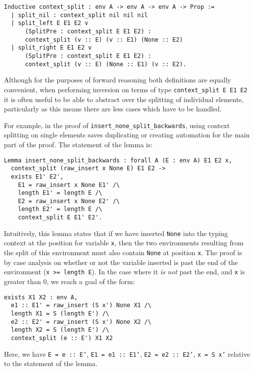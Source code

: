 \documentclass[]{unswthesis}
\let\c\texttt
\let\i\textit
\begin{document}
\begin{verbatim}
Inductive context_split : env A -> env A -> env A -> Prop :=
  | split_nil : context_split nil nil nil
  | split_left E E1 E2 v
  	  (SplitPre : context_split E E1 E2) :
  	  context_split (v :: E) (v :: E1) (None :: E2)
  | split_right E E1 E2 v
  	  (SplitPre : context_split E E1 E2) :
  	  context_split (v :: E) (None :: E1) (v :: E2).
\end{verbatim}

Although for the purposes of forward reasoning both definitions are equally convenient, when performing inversion on terms of type \c{context_split E E1 E2} it is often useful to be able to abstract over the splitting of individual elements, particularly as this means there are less cases which have to be handled.

For example, in the proof of \c{insert_none_split_backwards}, using context splitting on single elements saves duplicating or creating automation for the main part of the proof. The statement of the lemma is:

\begin{verbatim}
Lemma insert_none_split_backwards : forall A (E : env A) E1 E2 x,
  context_split (raw_insert x None E) E1 E2 ->
  exists E1' E2',
    E1 = raw_insert x None E1' /\
    length E1' = length E /\
    E2 = raw_insert x None E2' /\
    length E2' = length E /\
    context_split E E1' E2'.
\end{verbatim}

Intuitively, this lemma states that if we have inserted \c{None} into the typing context at the position for variable \c{x}, then the two environments resulting from the split of this environment must also contain \c{None} at position \c{x}. The proof is by case analysis on whether or not the variable inserted is past the end of the environment (\c{x >= length E}). In the case where it \i{is not} past the end, and \c{x} is greater than 0, we reach a goal of the form:

\begin{verbatim}
exists X1 X2 : env A,
  e1 :: E1' = raw_insert (S x') None X1 /\
  length X1 = S (length E') /\
  e2 :: E2' = raw_insert (S x') None X2 /\
  length X2 = S (length E') /\
  context_split (e :: E') X1 X2
\end{verbatim}

Here, we have \c{E = e :: E'}, \c{E1 = e1 :: E1'}, \c{E2 = e2 :: E2'}, \c{x = S x'} relative to the statement of the lemma.
\end{document}
